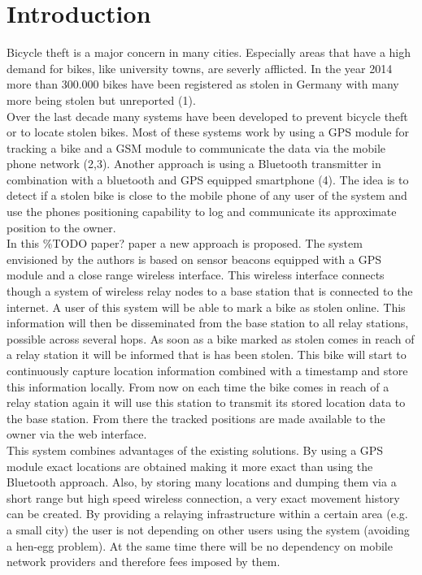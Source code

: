 \documentclass[a4paper]{article}
\begin{document}
\section{Introduction}
Bicycle theft is a major concern in many cities. Especially areas that have a high demand for bikes, like university towns, are severly afflicted. In the year 2014 more than 300.000 bikes have been registered as stolen in Germany with many more being stolen but unreported (1).\\
Over the last decade many systems have been developed to prevent bicycle theft or to locate stolen bikes. Most of these systems work by using a GPS module for tracking a bike and a GSM module to communicate the data via the mobile phone network (2,3). Another approach is using a Bluetooth transmitter in combination with a bluetooth and GPS equipped smartphone (4). The idea is to detect if a stolen bike is close to the mobile phone of any user of the system and use the phones positioning capability to log and communicate its approximate position to the owner.\\
In this \%TODO paper? paper a new approach is proposed. The system envisioned by the authors is based on sensor beacons equipped with a GPS module and a close range wireless interface. This wireless interface connects though a system of wireless relay nodes to a base station that is connected to the internet. A user of this system will be able to mark a bike as stolen online. This information will then be disseminated from the base station to all relay stations, possible across several hops. As soon as a bike marked as stolen comes in reach of a relay station it will be informed that is has been stolen. This bike will start to continuously capture location information combined with a timestamp and store this information locally. From now on each time the bike comes in reach of a relay station again it will use this station to transmit its stored location data to the base station. From there the tracked positions are made available to the owner via the web interface.\\
This system combines advantages of the existing solutions. By using a GPS module exact locations are obtained making it more exact than using the Bluetooth approach. Also, by storing many locations and dumping them via a short range but high speed wireless connection, a very exact movement history can be created. By providing a relaying infrastructure within a certain area (e.g. a small city) the user is not depending on other users using the system (avoiding a hen-egg problem). At the same time there will be no dependency on mobile network providers and therefore fees imposed by them.\\
\end{document}

